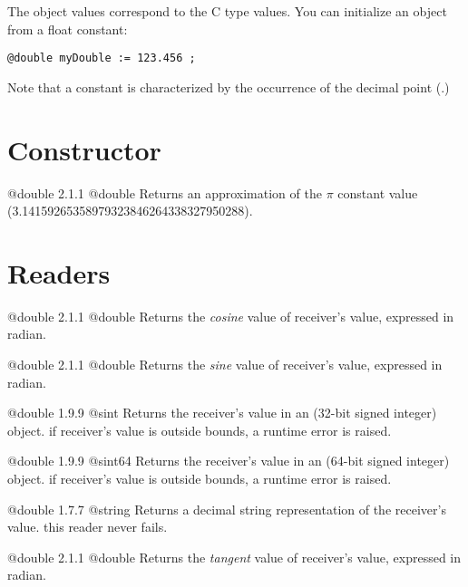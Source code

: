 

The  object values correspond to the C type  values. You can initialize an  object from a float constant:

\texttt{@double myDouble := 123.456 ;}

Note that a  constant is characterized by the occurrence of the decimal point (.)

\section{Constructor}

{@double}
{2.1.1}
{@double}
{Returns an approximation of the $\pi$ constant value (3.14159265358979323846264338327950288).}
{}

\section{Readers}

{@double}
{2.1.1}
{@double}
{Returns the \emph{cosine} value of receiver's value, expressed in radian.}
{}




{@double}
{2.1.1}
{@double}
{Returns the \emph{sine} value of receiver's value, expressed in radian.}
{}




{@double}
{1.9.9}
{@sint}
{Returns the receiver's value in an  (32-bit signed integer) object.}
{if receiver's value is outside  bounds, a runtime error is raised.}



{@double}
{1.9.9}
{@sint64}
{Returns the receiver's value in an  (64-bit signed integer) object.}
{if receiver's value is outside  bounds, a runtime error is raised.}




{@double}
{1.7.7}
{@string}
{Returns a decimal string representation of the receiver's value.}
{this reader never fails.}




{@double}
{2.1.1}
{@double}
{Returns the \emph{tangent} value of receiver's value, expressed in radian.}
{}







